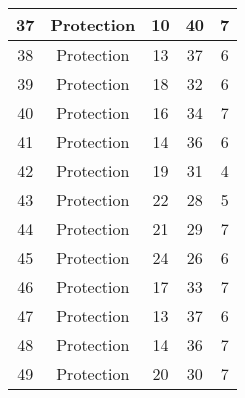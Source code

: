 \documentclass[results.tex]{subfiles}
\begin{document}
\begin{center}
\begin{tabular}{| c || c | c | c | c |}
            \hline
            37                      & Protection                   & 10                     & 40                      & 7                    \\
            \hline
            38                      & Protection                   & 13                     & 37                      & 6                    \\
            \hline
            39                      & Protection                   & 18                     & 32                      & 6                    \\
            \hline
            40                      & Protection                   & 16                     & 34                      & 7                    \\
            \hline
            41                      & Protection                   & 14                     & 36                      & 6                    \\
            \hline
            42                      & Protection                   & 19                     & 31                      & 4                    \\
            \hline
            43                      & Protection                   & 22                     & 28                      & 5                    \\
            \hline
            44                      & Protection                   & 21                     & 29                      & 7                    \\
            \hline
            45                      & Protection                   & 24                     & 26                      & 6                    \\
            \hline
            46                      & Protection                   & 17                     & 33                      & 7                    \\
            \hline
            47                      & Protection                   & 13                     & 37                      & 6                    \\
            \hline
            48                      & Protection                   & 14                     & 36                      & 7                    \\
            \hline
            49                      & Protection                   & 20                     & 30                      & 7                    \\
            \hline
        \end{tabular}
    \end{center}
\end{document}
